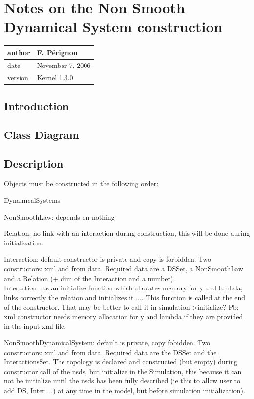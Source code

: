 \documentclass[10pt]{report}
\begin{document}
\chapter{Notes on the Non Smooth Dynamical System construction}
\begin{table}[!ht]
  \begin{tabular}{|l|l|}
    \hline
    author  & F.  P\'erignon \\
    \hline
    date    & November 7, 2006 \\ 
    \hline
    version & Kernel 1.3.0 \\
    \hline
  \end{tabular}
\end{table}

\section{Introduction}

\section{Class Diagram}

\section{Description}

Objects must be constructed in the following order: 
\bei
\item DynamicalSystems
\item NonSmoothLaw: depends on nothing
\item Relation: no link with an interaction during construction, this will be done during initialization. 
\item Interaction: default constructor is private and copy is forbidden. Two constructors: xml and from data. Required data are a DSSet, a NonSmoothLaw and
a Relation (+ dim of the Interaction and a number). \\
Interaction has an initialize function which allocates memory for y and lambda, links correctly the relation and initializes it .... This function is called at the 
end of the constructor. That may be better to call it in simulation->initialize? Pb: xml constructor needs memory allocation for y and lambda if they are
provided in the input xml file. 
\item NonSmoothDynamicalSystem: default is private, copy fobidden. Two constructors: xml and from data. Required data are the DSSet and the InteractionsSet.
The topology is declared and constructed (but empty) during constructor call of the nsds, but initialize in the Simulation, this because it can not be initialize until the nsds has been fully described (ie this to allow user to add DS, Inter ...) at any time in the model, but before simulation initialization). 
\end{document}
